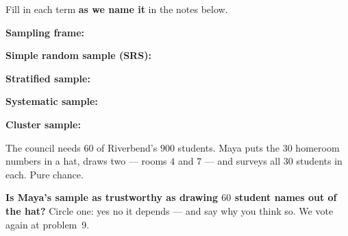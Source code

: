 \documentclass[12pt]{article}
\newcommand{\termrowheight}{2.3cm}
\newlength{\termrowinset}\setlength{\termrowinset}{7pt}
\newcommand{\vterm}[1]{%
  \par\noindent\begin{minipage}[t][\termrowheight][t]{\linewidth}%
    \vspace*{\termrowinset}%
    \textbf{\textcolor{cerulean}{#1:}}%
  \end{minipage}\par}
\begin{document}

\vspace{0.15in}

\begin{vocabbox}
\small
Fill in each term \textbf{as we name it} in the notes below.
\vterm{Sampling frame}
\vterm{Simple random sample (SRS)}
\vterm{Stratified sample}
\vterm{Systematic sample}
\vterm{Cluster sample}
\end{vocabbox}

\boxguard[12]
\begin{hookbox}
\small
The council needs $60$ of Riverbend's $900$ students. Maya puts the $30$ homeroom numbers in a
hat, draws two --- rooms $4$ and $7$ --- and surveys all $30$ students in each. Pure chance.

\vspace{3pt}
\textbf{Is Maya's sample as trustworthy as drawing $60$ student names out of the hat?} Circle
one: \quad yes \qquad no \qquad it depends \quad --- and say why you think so. We vote again
at problem~9.
\par{}
\end{hookbox}
\end{document}
